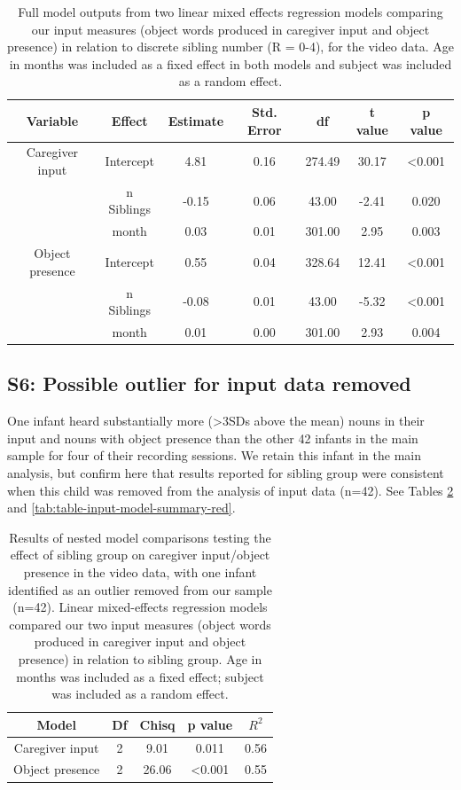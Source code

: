 \documentclass[
  man,mask,floatsintext]{apa6}
\begin{document}
\begin{longtable}[t]{ccccccc}
\caption{\label{tab:table-input-model-summary-discrete}Full model outputs from two linear mixed effects regression models comparing our input measures (object words produced in caregiver input and object presence) in relation to discrete sibling number (R = 0-4), for the video data. Age in months was included as a fixed effect in both models and subject was included as a random effect.}\\
\toprule
Variable & Effect & Estimate & Std. Error & df & t value & p value\\
\midrule
Caregiver input & Intercept & 4.81 & 0.16 & 274.49 & 30.17 & <0.001\\
 & n Siblings & -0.15 & 0.06 & 43.00 & -2.41 & 0.020\\
 & month & 0.03 & 0.01 & 301.00 & 2.95 & 0.003\\
\midrule
Object presence & Intercept & 0.55 & 0.04 & 328.64 & 12.41 & <0.001\\
 & n Siblings & -0.08 & 0.01 & 43.00 & -5.32 & <0.001\\
\addlinespace
 & month & 0.01 & 0.00 & 301.00 & 2.93 & 0.004\\
\bottomrule
\end{longtable}

\newpage

\hypertarget{s6-possible-outlier-for-input-data-removed}{%
\subsection{S6: Possible outlier for input data removed}\label{s6-possible-outlier-for-input-data-removed}}

One infant heard substantially more (\textgreater3SDs above the mean) nouns in their input and nouns with object presence than the other 42 infants in the main sample for four of their recording sessions. We retain this infant in the main analysis, but confirm here that results reported for sibling group were consistent when this child was removed from the analysis of input data (n=42). See Tables \ref{tab:table-model-comparisons-red} and \ref{tab:table-input-model-summary-red}.

\begin{longtable}[t]{ccccc}
\caption{\label{tab:table-model-comparisons-red}Results of nested model comparisons testing the effect of sibling group on caregiver input/object presence in the video data, with one infant identified as an outlier removed from our sample (n=42). Linear mixed-effects regression models compared our two input measures (object words produced in caregiver input  and object presence) in relation to sibling group. Age in months was included as a fixed effect; subject was included as a random effect.}\\
\toprule
Model & Df & Chisq & p value & $R^{2}$\\
\midrule
Caregiver input & 2 & 9.01 & 0.011 & 0.56\\
Object presence & 2 & 26.06 & <0.001 & 0.55\\
\bottomrule
\end{longtable}
\end{document}
